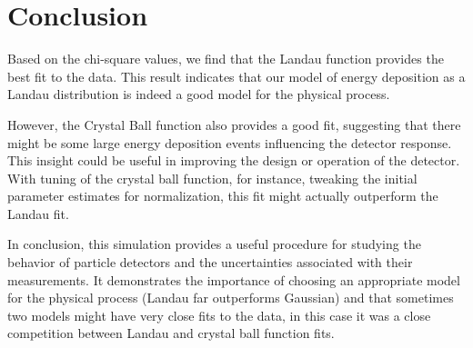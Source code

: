 \documentclass{article}
\begin{document}
\section*{Conclusion}

Based on the chi-square values, we find that the Landau function provides the best fit to the data. This result indicates that our model of energy deposition as a Landau distribution is indeed a good model for the physical process. 

However, the Crystal Ball function also provides a good fit, suggesting that there might be some large energy deposition events influencing the detector response. This insight could be useful in improving the design or operation of the detector. With tuning of the crystal ball function, for instance, tweaking the initial parameter estimates for normalization, this fit might actually outperform the Landau fit. 

In conclusion, this simulation provides a useful procedure for studying the behavior of particle detectors and the uncertainties associated with their measurements. It demonstrates the importance of choosing an appropriate model for the physical process (Landau far outperforms Gaussian) and that sometimes two models might have very close fits to the data, in this case it was a close competition between Landau and crystal ball function fits.
\end{document}
